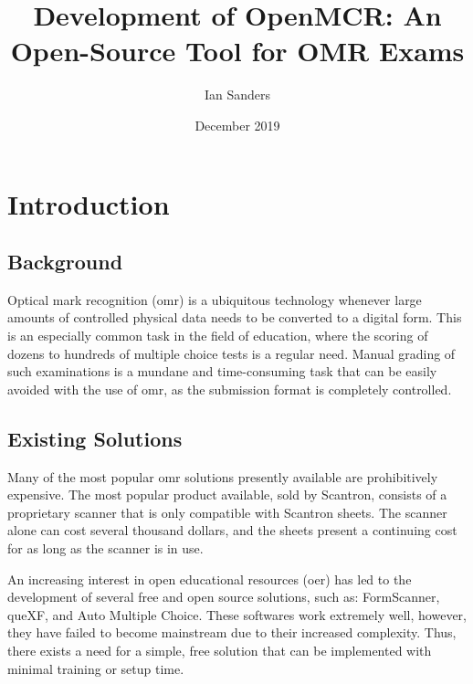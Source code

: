 \documentclass[12pt, letterpaper]{report}
\begin{document}
\frenchspacing



\renewcommand{\appendixname}{Appendix}

\title{Development of OpenMCR: An Open-Source Tool for OMR Exams}
\author{Ian Sanders}
\date{December 2019}
\maketitle

\tableofcontents
\listofcodesamples
\listoffigures
\listofeqns
\printacronyms[include-classes=abbrev,name=Abbreviations]

\chapter{Introduction}
\section{Background}
Optical mark recognition (\ac{omr}) is a ubiquitous technology whenever large amounts
of controlled physical data needs to be converted to a digital form. This is an
especially common task in the field of education, where the scoring of dozens to
hundreds of multiple choice tests is a regular need. Manual grading of such
examinations is a mundane and time-consuming task that can be easily avoided
with the use of \ac{omr}, as the submission format is completely controlled.
\section{Existing Solutions}
Many of the most popular \ac{omr} solutions presently available are prohibitively
expensive. The most popular product available, sold by Scantron, consists of a
proprietary scanner that is only compatible with Scantron sheets. The scanner
alone can cost several thousand dollars, and the sheets present a continuing
cost for as long as the scanner is in use.

An increasing interest in open educational resources (\ac{oer}) has led to the
development of several free and open source solutions, such as: FormScanner,
queXF, and Auto Multiple Choice. These softwares work extremely well, however,
they have failed to become mainstream due to their increased complexity. Thus,
there exists a need for a simple, free solution that can be implemented with
minimal training or setup time.
\end{document}
